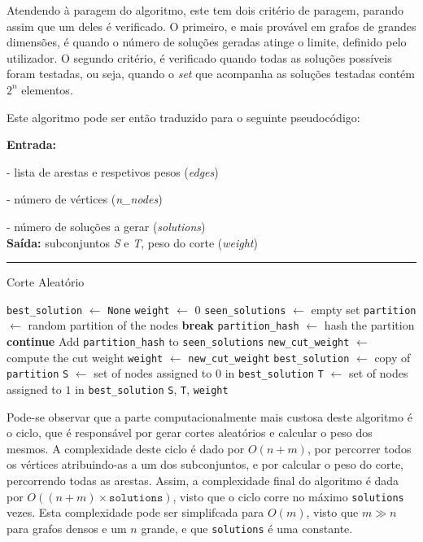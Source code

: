 \documentclass[mirror, portugues]{revdetua}
\begin{document}
Atendendo à paragem do algoritmo, este tem dois critério de paragem, parando assim que um deles é verificado. O primeiro, e mais provável em grafos de grandes dimensões, é quando o número de soluções geradas atinge o limite, definido pelo utilizador. O segundo critério, é verificado quando todas as soluções possíveis foram testadas, ou seja, quando o \textit{set} que acompanha as soluções testadas contém $2^n$ elementos.

Este algoritmo pode ser então traduzido para o seguinte pseudocódigo:

\begin{algorithm}[H]
\raggedright
\textbf{Entrada:}

- lista de arestas e respetivos pesos (\textit{edges})

- número de vértices (\textit{n\_nodes})

- número de soluções a gerar (\textit{solutions})\\
\textbf{Saída:} subconjuntos \textit{S} e \textit{T}, peso do corte (\textit{weight}) \\
\hrule 
\caption{Corte Aleatório}
\begin{algorithmic}[1]
    \State \texttt{best\_solution} $\gets$ \texttt{None}
    \State \texttt{weight} $\gets$ 0
    \State \texttt{seen\_solutions} $\gets$ empty set
        \State \texttt{partition} $\gets$ random partition of the nodes
            \State \textbf{break}
        \EndIf
        \State \texttt{partition\_hash} $\gets$ hash the partition
            \State \textbf{continue}
        \EndIf
        \State Add \texttt{partition\_hash} to \texttt{seen\_solutions}
        \State \texttt{new\_cut\_weight} $\gets$ compute the cut weight
            \State \texttt{weight} $\gets$ \texttt{new\_cut\_weight}
            \State \texttt{best\_solution} $\gets$ copy of \texttt{partition}
        \EndIf
    \EndFor
    \State \texttt{S} $\gets$ set of nodes assigned to $0$ in \texttt{best\_solution}
    \State \texttt{T} $\gets$ set of nodes assigned to $1$ in \texttt{best\_solution}
    \Return \texttt{S}, \texttt{T}, \texttt{weight}
\end{algorithmic}
\end{algorithm}
    
Pode-se observar que a parte computacionalmente mais custosa deste algoritmo é o ciclo, que é responsável por gerar cortes aleatórios e calcular o peso dos mesmos. A complexidade deste ciclo é dado por $O(n + m)$, por percorrer todos os vértices atribuindo-as a um dos subconjuntos, e por calcular o peso do corte, percorrendo todas as arestas. Assim, a complexidade final do algoritmo é dada por $O((n + m) \times \texttt{solutions})$, visto que o ciclo corre no máximo \texttt{solutions} vezes. Esta complexidade pode ser simplifcada para $O(m)$, visto que $m \gg n$ para grafos densos e um $n$ grande, e que \texttt{solutions} é uma constante.
\end{document}
